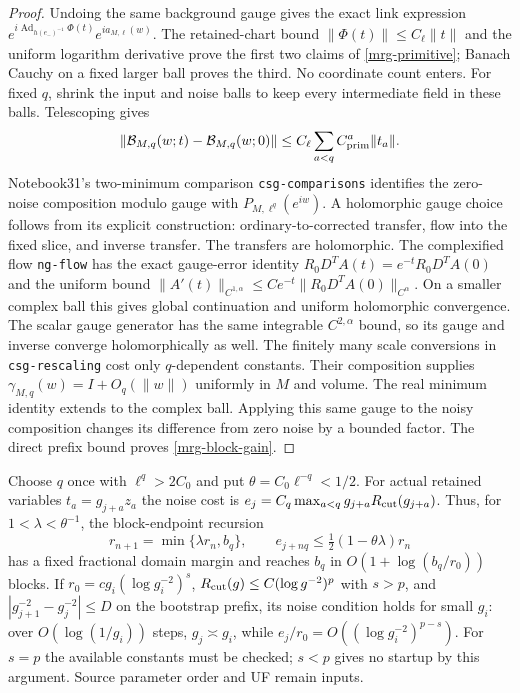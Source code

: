 \begin{proof}
Undoing the same background gauge gives the exact link expression
$e^{i\operatorname{Ad}_{h(e_-)^{-1}}\Phi(t)}e^{ia_{M,\ell}(w)}$.
The retained-chart bound $\|\Phi(t)\|\le C_\ell\|t\|$ and the
uniform logarithm derivative prove the first two claims of
\eqref{mrg-primitive}; Banach Cauchy on a fixed larger ball proves
the third. No coordinate count enters.
For fixed $q$, shrink the input and noise balls to keep every
intermediate field in these balls. Telescoping gives
\[
 \|\mathcal B_{M,q}(w;t)-\mathcal B_{M,q}(w;0)\|
       \le C_\ell\sum_{a<q}C_{\rm prim}^{a}\|t_a\|.
\]
Notebook31's two-minimum comparison \texttt{csg-comparisons}
identifies the zero-noise composition modulo gauge with
$P_{M,\ell^q}(e^{iw})$. A holomorphic gauge choice follows from its
explicit construction: ordinary-to-corrected transfer, flow into the
fixed slice, and inverse transfer. The transfers are holomorphic.
The complexified flow \texttt{ng-flow} has the exact gauge-error
identity $R_0D^TA(t)=e^{-t}R_0D^TA(0)$ and the uniform bound
$\|A'(t)\|_{C^{1,\alpha}}\le Ce^{-t}\|R_0D^TA(0)\|_{C^\alpha}$.
On a smaller complex ball this gives global continuation and uniform
holomorphic convergence. The scalar gauge generator has the same
integrable $C^{2,\alpha}$ bound, so its gauge and inverse converge
holomorphically as well. The finitely many scale conversions in
\texttt{csg-rescaling} cost only $q$-dependent constants. Their
composition supplies $\gamma_{M,q}(w)=I+O_q(\|w\|)$ uniformly in
$M$ and volume. The real minimum identity extends to the complex ball.
Applying this same gauge to the noisy composition changes its difference
from zero noise by a bounded factor. The direct prefix bound proves
\eqref{mrg-block-gain}.
\end{proof}

Choose $q$ once with $\ell^q>2C_0$ and put $\theta=C_0\ell^{-q}<1/2$.
For actual retained variables $t_a=g_{j+a}z_a$ the noise cost is
$e_j=C_q\max_{a<q}g_{j+a}R_{\rm cut}(g_{j+a})$.
Thus, for $1<\lambda<\theta^{-1}$, the block-endpoint recursion
\begin{equation}
 r_{n+1}=\min\{\lambda r_n,b_q\},\qquad
 e_{j+nq}\le\tfrac12(1-\theta\lambda)r_n
 \label{mrg-radius-recursion}
\end{equation}
has a fixed fractional domain margin and reaches $b_q$ in
$O(1+\log(b_q/r_0))$ blocks. If $r_0=cg_i(\log g_i^{-2})^s$,
$R_{\rm cut}(g)\le C(\log g^{-2})^p$ with $s>p$, and
$|g_{j+1}^{-2}-g_j^{-2}|\le D$ on the bootstrap prefix, its noise
condition holds for small $g_i$: over $O(\log(1/g_i))$ steps,
$g_j\asymp g_i$, while $e_j/r_0=O((\log g_i^{-2})^{p-s})$.
For $s=p$ the available constants must be checked; $s<p$ gives no
startup by this argument. Source parameter order and UF remain inputs.

